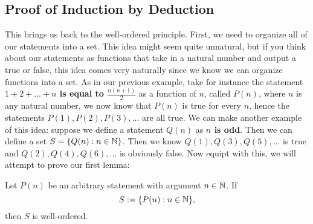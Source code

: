 \subsection{Proof of Induction by Deduction}
This brings us back to the well-ordered principle.
First, we need to organize all of our statements into a set.
This idea might seem quite unnatural, but if you think about our statements as functions that take in a natural number and output a true or false, this idea comes very naturally since we know we can organize functions into a set.
As in our previous example, take for instance the statement \textbf{$1+2+...+n$ is equal to $\frac{n(n+1)}{2}$} as a function of $n$, called $P(n)$, where $n$ is any natural number, we now know that $P(n)$ is true for every $n$, hence the statements $P(1),P(2),P(3),...$ are all true. 
We can make another example of this idea: suppose we define a statement $Q(n)$ as \textbf{$n$ is odd}. Then we can define a set $S=\{Q(n):n\in\mathbb{N}\}$. Then we know $Q(1),Q(3),Q(5),...$ is true and $Q(2),Q(4),Q(6),...$ is obviously false. Now equipt with this, we will attempt to prove our first lemma:
\begin{lemma}
\label{lem:well-order}
	Let $P(n)$ be an arbitrary statement with argument $n\in\mathbb{N}$. If
	$$S:=\{P(n):n\in\mathbb{N}\},$$
	then $S$ is well-ordered.
\end{lemma}
